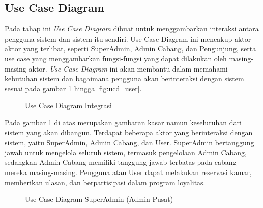 \subsection{Use Case Diagram}

Pada tahap ini \textit{Use Case Diagram} dibuat untuk menggambarkan interaksi antara pengguna sistem dan sistem itu sendiri. Use Case Diagram ini mencakup aktor-aktor yang terlibat, seperti SuperAdmin, Admin Cabang, dan Pengunjung, serta use case yang menggambarkan fungsi-fungsi yang dapat dilakukan oleh masing-masing aktor. \textit{Use Case Diagram} ini akan membantu dalam memahami kebutuhan sistem dan bagaimana pengguna akan berinteraksi dengan sistem sesuai pada gambar \ref{fig:ucd_integrasi} hingga \ref{fig:ucd_user}.

\begin{figure}[H] %
    \centering
    \caption{Use Case Diagram Integrasi}
    \label{fig:ucd_integrasi} %
\end{figure}

Pada gambar \ref{fig:ucd_integrasi} di atas merupakan gambaran kasar namun keseluruhan dari sistem yang akan dibangun. Terdapat beberapa aktor yang berinteraksi dengan sistem, yaitu SuperAdmin, Admin Cabang, dan User. SuperAdmin bertanggung jawab untuk mengelola seluruh sistem, termasuk pengelolaan Admin Cabang, sedangkan Admin Cabang memiliki tanggung jawab terbatas pada cabang mereka masing-masing. Pengguna atau User dapat melakukan reservasi kamar, memberikan ulasan, dan berpartisipasi dalam program loyalitas.

\begin{figure}[H] %
    \centering
    \caption{Use Case Diagram SuperAdmin (Admin Pusat)}
    \label{fig:ucd_sa} %
\end{figure}

